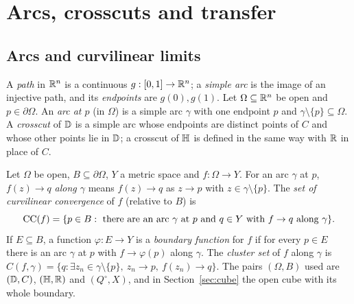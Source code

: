 \section{Arcs, crosscuts and transfer}\label{sec:plane}

\subsection{Arcs and curvilinear limits}

\begin{definition}[arcs]\label{def:arcs}
A \emph{path} in $\mathbb{R}^n$ is a continuous $g:[0,1]\to\mathbb{R}^n$; a \emph{simple arc} is the image of an
injective path, and its \emph{endpoints} are $g(0),g(1)$. Let $\Omega\subseteq\mathbb{R}^n$ be open and
$p\in\partial\Omega$. An \emph{arc at $p$} (in $\Omega$) is a simple arc $\gamma$ with one endpoint $p$
and $\gamma\setminus\{p\}\subseteq\Omega$. A \emph{crosscut} of $\mathbb{D}$ is a simple arc whose endpoints
are distinct points of $C$ and whose other points lie in $\mathbb{D}$; a crosscut of $\mathbb{H}$ is defined in the
same way with $\mathbb{R}$ in place of $C$.
\end{definition}

\begin{definition}\label{def:ccset}
Let $\Omega$ be open, $B\subseteq\partial\Omega$, $Y$ a metric space and $f:\Omega\to Y$. For an arc
$\gamma$ at $p$, $f(z)\to q$ \emph{along $\gamma$} means $f(z)\to q$ as $z\to p$ with
$z\in\gamma\setminus\{p\}$. The \emph{set of curvilinear convergence} of $f$ (relative to $B$) is
\[
\operatorname{CC}(f)=\{p\in B:\ \text{there are an arc $\gamma$ at $p$ and $q\in Y$ with $f\to q$ along $\gamma$}\}.
\]
If $E\subseteq B$, a function $\varphi:E\to Y$ is a \emph{boundary function} for $f$ if for every
$p\in E$ there is an arc $\gamma$ at $p$ with $f\to\varphi(p)$ along $\gamma$. The \emph{cluster set}
of $f$ along $\gamma$ is $C(f,\gamma)=\{q:\exists z_n\in\gamma\setminus\{p\},\ z_n\to p,\ f(z_n)\to q\}$.
The pairs $(\Omega,B)$ used are $(\mathbb{D},C)$, $(\mathbb{H},\mathbb{R})$ and $(Q^\circ,X)$, and in Section~\ref{sec:cube}
the open cube with its whole boundary.
\end{definition}

